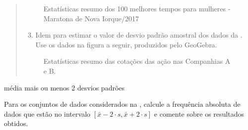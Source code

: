 \begin{quote}
\begin{enumerate}
\end{enumerate}

\begin{figure}[H]
\centering
\capstart

\noindent{}
\caption{Estatísticas resumo dos 100 melhores tempos para mulheres - Maratona de Nova Iorque/2017}\label{\detokenize{PE104-5:fig-summarymaratonamulheres}}\label{\detokenize{PE104-5:id3}}\end{figure}
\begin{enumerate}
\setcounter{enumi}{2}
\item {} 
Idem para estimar o valor de desvio padrão amostral dos dados da . Use os dados na figura a seguir, produzidos pelo GeoGebra.

\end{enumerate}

\begin{figure}[H]
\centering
\capstart

\noindent{}
\caption{Estatísticas resumo das cotações das ação nas Companhias A e B.}\label{\detokenize{PE104-5:fig-estrategia}}\label{\detokenize{PE104-5:id4}}\end{figure}
\end{quote}


\label{\detokenize{PE104-5:ativ-mediamaisoumenosdoisdesvios}}
\begin{task}{média mais ou menos 2 desvios padrões}

Para os conjuntos de dados considerados na , calcule a frequência absoluta de dados que estão no intervalo \([\bar{x}-2\cdot s,\bar{x}+2\cdot s]\) e comente sobre os resultados obtidos.
\end{task}



